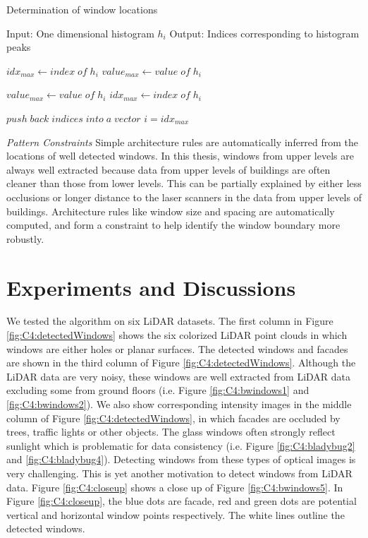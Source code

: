 \begin{algorithm}
\caption{Determination of window locations}
\label{tab:c4:A1}
\begin{algorithmic}
\STATE Input:  One dimensional histogram $h_i$
\STATE Output:  Indices corresponding to histogram peaks 

\STATE $ idx_{max} \gets index \; of \; h_i$
\STATE $ value_{max} \gets value \; of \; h_i$

\ENDIF

\STATE $value_{max} \gets value \; of \; h_i$
\STATE $idx_{max} \gets index \; of \; h_i$
\ENDIF
\ENDFOR

\STATE $push \; back \; indices \; into \; a \; vector$
\STATE $ i = idx_{max}$
\ENDIF
\ENDFOR

\end{algorithmic}
\end{algorithm}

{\it Pattern Constraints}  Simple architecture rules are automatically inferred from the locations of well detected windows. In this thesis, windows from upper levels are always well extracted because data from upper levels of buildings are often cleaner than those from lower levels. This can be partially explained by either less occlusions or longer distance to the laser scanners in the data from upper levels of buildings. Architecture rules like window size and spacing are automatically computed, and form a constraint to help identify the window boundary more robustly. 

\section{Experiments and Discussions}  

We tested the algorithm on six LiDAR datasets. The first column in Figure \ref{fig:C4:detectedWindows} shows the six colorized LiDAR point clouds in which windows are either holes or planar surfaces. The detected windows and facades are shown in the third column of Figure \ref{fig:C4:detectedWindows}. Although the LiDAR data are very noisy, these windows are well extracted from LiDAR data excluding some from ground floors (i.e. Figure \ref{fig:C4:bwindows1} and \ref {fig:C4:bwindows2}). We also show corresponding intensity images in the middle column of Figure \ref{fig:C4:detectedWindows}, in which facades are occluded by trees, traffic lights or other objects. The glass windows often strongly reflect sunlight which is problematic for data consistency (i.e.  Figure \ref {fig:C4:bladybug2} and \ref{fig:C4:bladybug4}). Detecting windows from these types of optical images is very challenging. This is yet another motivation to detect windows from LiDAR data. Figure \ref{fig:C4:closeup} shows a close up of Figure \ref{fig:C4:bwindows5}. In Figure \ref{fig:C4:closeup}, the blue dots are facade, red and green dots are potential vertical and horizontal window points respectively. The white lines outline the detected windows. 

